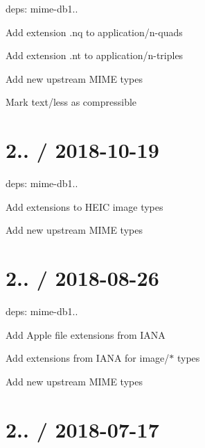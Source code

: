 
\begin{DoxyItemize}
\item deps\+: mime-\/db1..
\begin{DoxyItemize}
\item Add extension {\ttfamily .nq} to {\ttfamily application/n-\/quads}
\item Add extension {\ttfamily .nt} to {\ttfamily application/n-\/triples}
\item Add new upstream M\+I\+ME types
\item Mark {\ttfamily text/less} as compressible
\end{DoxyItemize}
\end{DoxyItemize}

\section*{2.. / 2018-\/10-\/19 }


\begin{DoxyItemize}
\item deps\+: mime-\/db1..
\begin{DoxyItemize}
\item Add extensions to H\+E\+IC image types
\item Add new upstream M\+I\+ME types
\end{DoxyItemize}
\end{DoxyItemize}

\section*{2.. / 2018-\/08-\/26 }


\begin{DoxyItemize}
\item deps\+: mime-\/db1..
\begin{DoxyItemize}
\item Add Apple file extensions from I\+A\+NA
\item Add extensions from I\+A\+NA for {\ttfamily image/$\ast$} types
\item Add new upstream M\+I\+ME types
\end{DoxyItemize}
\end{DoxyItemize}

\section*{2.. / 2018-\/07-\/17 }


